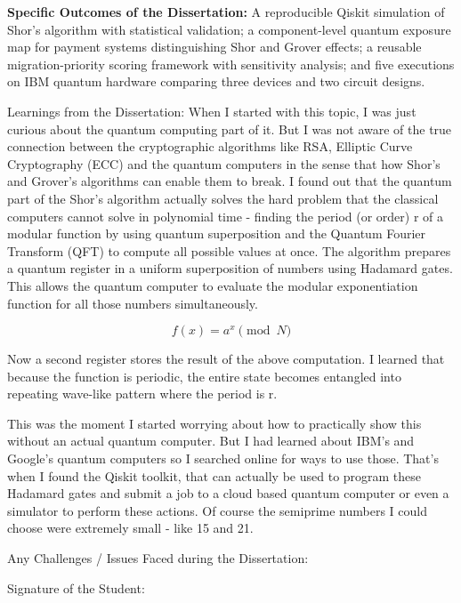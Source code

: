 \documentclass[12pt,oneside]{report}
\begin{document}
\textbf{Specific Outcomes of the Dissertation:} A reproducible Qiskit simulation of Shor's algorithm with statistical validation; a component-level quantum exposure map for payment systems distinguishing Shor and Grover effects; a reusable migration-priority scoring framework with sensitivity analysis; and five executions on IBM quantum hardware comparing three devices and two circuit designs. 
\par

Learnings from the Dissertation:
When I started with this topic, I was just curious about the quantum computing part of it. But I was not aware of the true connection between the cryptographic algorithms like RSA, Elliptic Curve Cryptography (ECC) and the quantum computers in the sense that how Shor's and Grover's algorithms can enable them to break. I found out that the quantum part of the Shor's algorithm actually solves the hard problem that the classical computers cannot solve in polynomial time - finding the period (or order) r of a modular function by using quantum superposition and the Quantum Fourier Transform (QFT) to compute all possible values at once. The algorithm prepares a quantum register in a uniform superposition of numbers using Hadamard gates. This allows the quantum computer to evaluate the modular exponentiation function for all those numbers simultaneously. 

        \[ f(x) = a^x \pmod{N} \]

        Now a second register stores the result of the above computation. I learned that because the function is periodic, the entire state becomes entangled into repeating wave-like pattern where the period is r.

This was the moment I started worrying about how to practically show this without an actual quantum computer. But I had learned about IBM's and Google's quantum computers so I searched online for ways to use those. That's when I found the Qiskit toolkit, that can actually be used to program these Hadamard gates and submit a job to a cloud based quantum computer or even a simulator to perform these actions. Of course the semiprime numbers I could choose were extremely small - like 15 and 21. 

\par

Any Challenges / Issues Faced during the Dissertation:
\par

Signature of the Student:
\par
\end{document}
